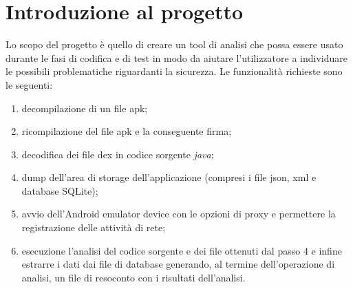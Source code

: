 
\section{Introduzione al progetto}\label{sec:introduzione-al-progetto}
Lo scopo del progetto è quello di creare un tool di analisi che possa essere usato durante le fasi di codifica e di test in modo da aiutare l'utilizzatore a individuare le possibili problematiche riguardanti la sicurezza.
Le funzionalità richieste sono le seguenti:
\begin{enumerate}
    \item decompilazione di un file apk;
    \item ricompilazione del file apk e la conseguente firma;
    \item decodifica dei file \gls{dex} in codice sorgente \textit{java};
    \item dump dell'area di storage dell'applicazione (compresi i file json, xml e database SQLite);
    \item avvio dell'Android emulator device con le opzioni di proxy e permettere la registrazione delle attività di rete;
    \item esecuzione l'analisi del codice sorgente e dei file ottenuti dal passo 4 e infine estrarre i dati dai file di database generando, al termine dell'operazione di analisi, un file di resoconto con i risultati dell'analisi.
\end{enumerate}